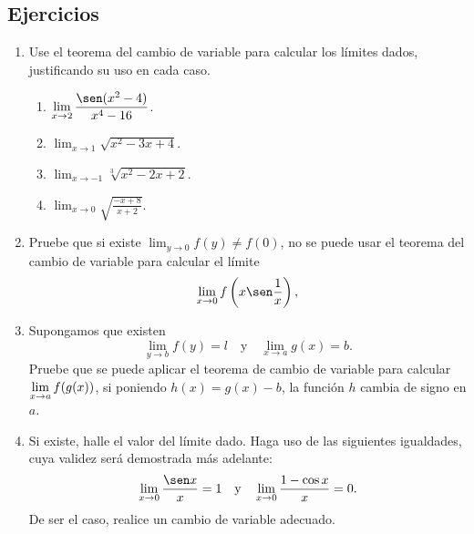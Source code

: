 \subsection{Ejercicios}
\begingroup
\small
\begin{multicols}{2}
\begin{enumerate}[leftmargin=*]
\item Use el teorema del cambio de variable para calcular los límites dados, justificando su
    uso en cada caso.
            \begin{enumerate}[leftmargin=*]
            \item $\displaystyle \lim_{x\to 2}\frac{\sen(x^2-4)}{x^4-16}$.
            \item $\displaystyle \lim_{x\to 1}\sqrt{x^2-3x+4}$.
            \item $\displaystyle \lim_{x\to -1}\sqrt[3]{x^2-2x+2}$.
            \item $\displaystyle \lim_{x\to 0}\sqrt{\frac{-x+8}{x+2}}$.
            \end{enumerate}

\item Pruebe que si existe $\displaystyle\lim_{y\to 0}f(y)\neq f(0)$, no se puede usar el teorema del cambio de variable para
    calcular el límite
\[
\lim_{x\to 0}f\left(x\sen \frac{1}{x}\right),
\]
\item Supongamos que existen
\[
\lim_{y\to b}f(y) = l \quad \text{y} \quad \lim_{x\to a}g(x) = b.
\]
Pruebe que se puede aplicar el teorema de cambio de variable para calcular
$\displaystyle\limjc{f(g(x))}{x}{a}$, si poniendo $h(x)=g(x)-b$, la función $h$ cambia de signo en $a$.

\item Si existe, halle el valor del límite dado. Haga uso de las siguientes igualdades, cuya
    validez será demostrada más adelante:
    \[
    \lim_{x\to 0}\frac{\sen x}{x}=1 \yjc
    \lim_{x\to 0}\frac{1-\cos x}{x}=0.
    \]
    De ser el caso, realice un cambio de variable adecuado.


\end{enumerate}
\end{multicols}
